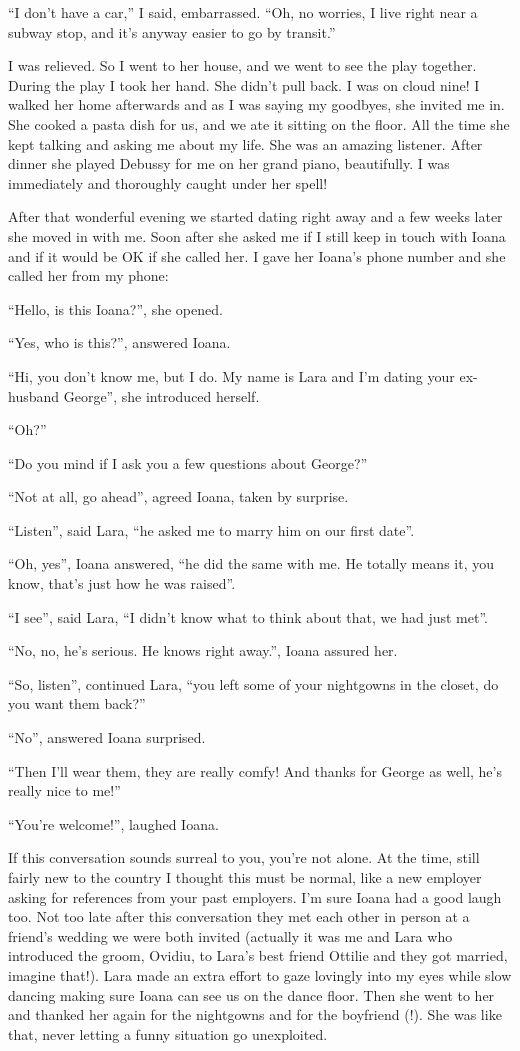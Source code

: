 \documentclass[12pt]{book}
\begin{document}
``I don't have a car,'' I said, embarrassed. ``Oh, no worries, I live
right near a subway stop, and it's anyway easier to go by transit.''

I was relieved. So I went to her house, and we went to see the play
together. During the play I took her hand. She didn't pull back. I was
on cloud nine! I walked her home afterwards and as I was saying my
goodbyes, she invited me in. She cooked a pasta dish for us, and we ate
it sitting on the floor. All the time she kept talking and asking me
about my life. She was an amazing listener. After dinner she played
Debussy for me on her grand piano, beautifully. I was immediately and
thoroughly caught under her spell!

After that wonderful evening we started dating right away and a few
weeks later she moved in with me. Soon after she asked me if I still
keep in touch with Ioana and if it would be OK if she called her. I gave
her Ioana's phone number and she called her from my phone:

``Hello, is this Ioana?'', she opened.

``Yes, who is this?'', answered Ioana.

``Hi, you don't know me, but I do. My name is Lara and I'm dating your
ex-husband George'', she introduced herself.

``Oh?''

``Do you mind if I ask you a few questions about George?''

``Not at all, go ahead'', agreed Ioana, taken by surprise.

``Listen'', said Lara, ``he asked me to marry him on our first date''.

``Oh, yes'', Ioana answered, ``he did the same with me. He totally means
it, you know, that's just how he was raised''.

``I see'', said Lara, ``I didn't know what to think about that, we had
just met''.

``No, no, he's serious. He knows right away.'', Ioana assured her.

``So, listen'', continued Lara, ``you left some of your nightgowns in
the closet, do you want them back?''

``No'', answered Ioana surprised.

``Then I'll wear them, they are really comfy! And thanks for George as
well, he's really nice to me!''

``You're welcome!'', laughed Ioana.

If this conversation sounds surreal to you, you're not alone. At the
time, still fairly new to the country I thought this must be normal,
like a new employer asking for references from your past employers. I'm
sure Ioana had a good laugh too. Not too late after this conversation
they met each other in person at a friend's wedding we were both invited
(actually it was me and Lara who introduced the groom, Ovidiu, to Lara's
best friend Ottilie and they got married, imagine that!). Lara made an
extra effort to gaze lovingly into my eyes while slow dancing making
sure Ioana can see us on the dance floor. Then she went to her and
thanked her again for the nightgowns and for the boyfriend (!). She was
like that, never letting a funny situation go unexploited.
\end{document}
